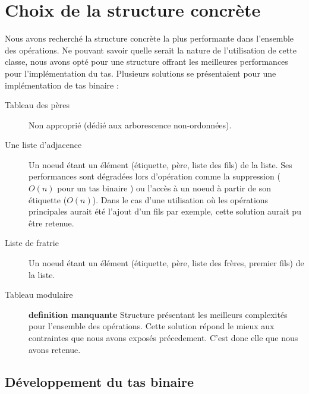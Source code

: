 \chapter[Structure concrète]{Choix de la structure concrète%
}



Nous avons recherché la structure concrète la plus performante dans l'ensemble des opérations. Ne pouvant savoir quelle serait la nature de l'utilisation de cette classe, nous avons opté pour une structure offrant les meilleures performances pour l'implémentation du tas.
Plusieurs solutions se présentaient pour une implémentation de tas binaire :
\begin{description}
\item
[Tableau des pères] Non approprié (dédié aux arborescence non-ordonnées).
\item[Une liste d'adjacence] Un noeud étant un élément  (étiquette, père, liste des fils) de la liste. Ses performances sont dégradées lors d'opération comme la suppression ($O(n)$ pour un tas binaire ) ou l'accès à un noeud à partir de son étiquette ($O(n)$). Dans le cas d'une utilisation où les opérations principales aurait été l'ajout d'un fils par exemple, cette solution aurait pu être retenue.
\item[Liste de fratrie]  Un noeud étant un élément (étiquette, père, liste des frères, premier fils)  de la liste.
\item[Tableau modulaire]
\textbf{definition manquante} Structure présentant les meilleurs complexités pour l'ensemble des opérations. Cette solution répond le mieux aux contraintes que nous avons exposés précedement. C'est donc elle que nous avons retenue. 
\end{description} 


\section[Développement]{Développement du tas binaire%
}

